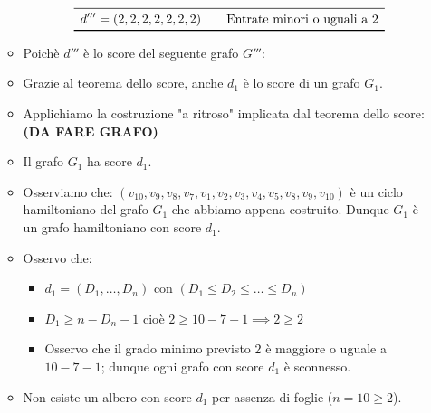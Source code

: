 \documentclass[10pt]{article}
\begin{document}
\begin{itemize}
\begin{itemize}
\[\begin{array}{cc}
		\midrule
		\begin{split} d''' &= (2,2,2,2,2,2,2) \end{split} & \textrm{Entrate minori o uguali a 2} \\
		\bottomrule
	\end{array}
	\]
	\item
	Poichè $d'''$ è lo score del seguente grafo $G'''$:
	\item
	Grazie al teorema dello score, anche $d_1$ è lo score di un grafo $G_1$.
	\item
	Applichiamo la costruzione "a ritroso" implicata dal teorema dello score: \textbf{(DA FARE GRAFO)}
	\item
	Il grafo $G_1$ ha score $d_1$.
	\item
	Osserviamo che: $(v_{10},v_{9},v_8,v_7,v_1,v_2,v_3,v_4,v_5,v_8,v_9,v_{10})$ è un ciclo hamiltoniano del grafo $G_1$ che abbiamo appena costruito. Dunque $G_1$ è un grafo hamiltoniano con score $d_1$.
	\item
	Osservo che:
	\begin{itemize}
	\item
	$d_1 = (D_1,\dotso,D_n)$ con $(D_1 \leq D_2 \leq \dotso \leq D_n)$
	\item
	$D_1 \geq n - D_n - 1$ cioè $2 \geq 10 - 7 - 1 \implies 2 \geq 2$
	\item
	Osservo che il grado minimo previsto $2$ è maggiore o uguale a $10-7-1$; dunque ogni grafo con score $d_1$ è sconnesso.
	\end{itemize}
	\item
	Non esiste un albero con score $d_1$ per assenza di foglie ($n = 10 \geq 2$).
	\end{itemize}
	

\end{itemize}
\end{document}
